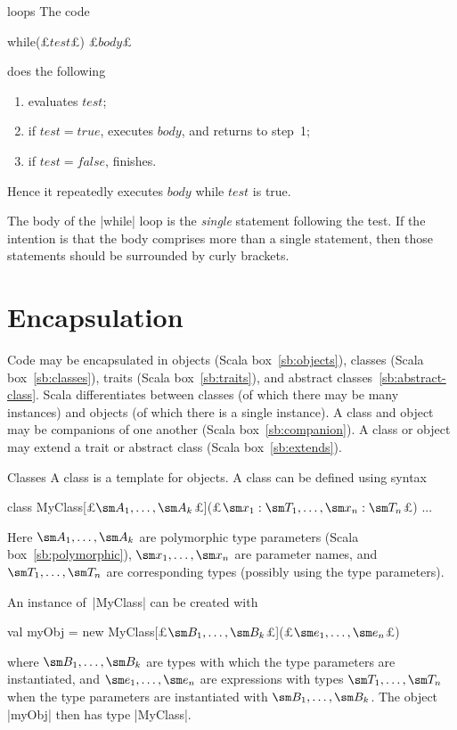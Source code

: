 \begin{scalaBox}{ loops}
\label{sb:while}
The code 
\begin{scala}
  while(£$test$£) £$body$£
\end{scala} 
does the following
\begin{enumerate}
  \item evaluates $test$;
  \item if $test = true$, executes $body$, and returns to step~1;
  \item if $test = false$, finishes.
\end{enumerate}
Hence it repeatedly executes $body$ while $test$ is true. 

The body of the |while| loop is the \emph{single} statement following the
test.  If the intention is that the body comprises more than a single
statement, then those statements should be surrounded by curly brackets.
\end{scalaBox}


\section{Encapsulation}
\label{sec:scala-encapsulation}

Code may be encapsulated in objects (Scala box~\ref{sb:objects}), classes
(Scala box~\ref{sb:classes}), traits (Scala box~\ref{sb:traits}), and abstract
classes~\ref{sb:abstract-class}.  Scala differentiates between classes (of
which there may be many instances) and objects (of which there is a single
instance).  A class and object may be companions of one another (Scala
box~\ref{sb:companion}).  A class or object may extend a trait or abstract
class (Scala box~\ref{sb:extends}).  


\begin{scalaBox}{Classes}
\label{sb:classes}
A class is a template for objects.  A class can be defined using syntax
\begin{scala}
  class MyClass[£$\sm A_1, \ldots, \sm A_k$£](£$\sm x_1: \sm T_1, \ldots, \sm x_n: \sm T_n$£){ ... } 
\end{scala}
Here $\sm A_1, \ldots, \sm A_k$ are polymorphic type parameters (Scala
box~\ref{sb:polymorphic}), $\sm x_1,\linebreak[1] \ldots,\linebreak[1] \sm
x_n$ are parameter names, and $\sm T_1, \ldots, \sm T_n$ are corresponding
types (possibly using the type parameters).  

An instance of~|MyClass| can be created with
\begin{scala}
  val myObj = new MyClass[£$\sm B_1, \ldots, \sm B_k$£](£$\sm e_1, \ldots, \sm e_n$£)
\end{scala}
where $\sm B_1, \ldots, \sm B_k$ are types with which the type parameters are
instantiated, and $\sm e_1, \ldots, \sm e_n$ are expressions with types $\sm
T_1, \ldots, \sm T_n$ when the type parameters are instantiated with $\sm B_1,
\ldots, \sm B_k$.  The object |myObj| then has type |MyClass|.
\end{scalaBox}

